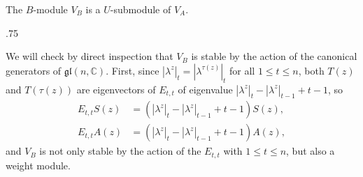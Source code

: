 \documentclass[11pt,fleqn]{article}
\makeatletter
\newcounter{para}[section]
\renewenvironment{proof}[1][\textit{Proof}]{\par
  \pushQED{\qed}%
  \normalfont \topsep.75\paraskip\relax
  \trivlist
  \item[\hskip\labelsep
        \itshape
    #1\@addpunct{.}]\ignorespaces
}{%
  \popQED\endtrivlist\@endpefalse
}
\newcommand\CC{\mathbb C}
\newcommand\gl{\mathfrak{gl}}
\makeatother
\begin{document}
\begin{Theorem}
\label{T:V-B-U-stable}
The $B$-module $V_B$ is a $U$-submodule of $V_A$.
\end{Theorem}
\begin{proof}
We will check by direct inspection that $V_B$ is stable by the action of the
canonical generators of $\gl(n,\CC)$. First, since $|\lambda^z|_t = 
|\lambda^{\tau(z)}|_t$ for all $1 \leq t \leq n$, both $T(z)$ and $T(\tau(z))$
are eigenvectors of $E_{t,t}$ of eigenvalue $|\lambda^z|_t - |\lambda^z|_{t-1} 
+ t-1$, so
\begin{align*}
E_{t,t} S(z) 
	&= (|\lambda^z|_t - |\lambda^z|_{t-1} + t-1) S(z), \\
E_{t,t} A(z) 
	&= (|\lambda^z|_t - |\lambda^z|_{t-1} + t-1) A(z),
\end{align*}
and $V_B$ is not only stable by the action of the $E_{t,t}$ with $1 \leq t 
\leq n$, but also a weight module.


\end{proof}
\end{document}
